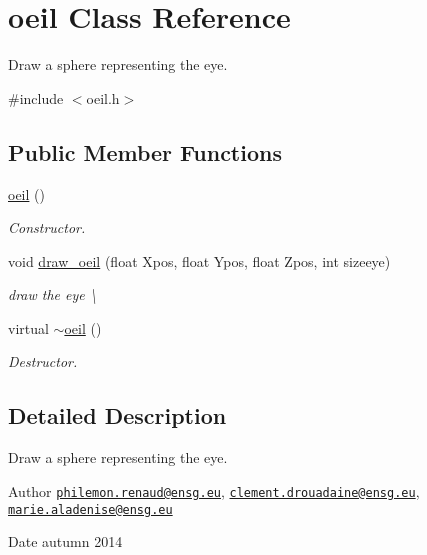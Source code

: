 \hypertarget{classoeil}{\section{oeil Class Reference}
\label{classoeil}
}


Draw a sphere representing the eye.  




{\ttfamily \#include $<$oeil.\+h$>$}

\subsection*{Public Member Functions}
\begin{DoxyCompactItemize}
\item 
\hyperlink{classoeil_a49b4c6d55eecd6acd6188fc6636defac}{oeil} ()
\begin{DoxyCompactList}\small\item\em Constructor. \end{DoxyCompactList}\item 
void \hyperlink{classoeil_a6e0144a3b4ce15a8cbc9e91d045b537c}{draw\+\_\+oeil} (float Xpos, float Ypos, float Zpos, int sizeeye)
\begin{DoxyCompactList}\small\item\em draw the eye \textbackslash{} \end{DoxyCompactList}\item 
virtual \hyperlink{classoeil_a763fa24757e39d89fd9584b71eab7239}{$\sim$oeil} ()
\begin{DoxyCompactList}\small\item\em Destructor. \end{DoxyCompactList}\end{DoxyCompactItemize}


\subsection{Detailed Description}
Draw a sphere representing the eye. 

\begin{DoxyAuthor}{Author}
\href{mailto:philemon.renaud@ensg.eu}{\tt philemon.\+renaud@ensg.\+eu}, \href{mailto:clement.drouadaine@ensg.eu}{\tt clement.\+drouadaine@ensg.\+eu}, \href{mailto:marie.aladenise@ensg.eu}{\tt marie.\+aladenise@ensg.\+eu} 
\end{DoxyAuthor}
\begin{DoxyDate}{Date}
autumn 2014 
\end{DoxyDate}


